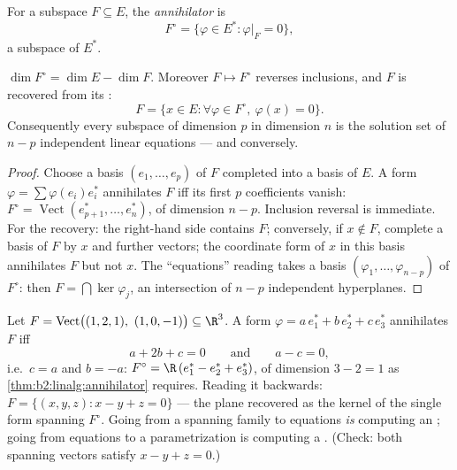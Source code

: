 \begin{definition}[Annihilator]\label{def:b2:linalg:annihilator}
For a subspace $F \subseteq E$, the
\emph{annihilator} is
\[
F^{\circ} = \{\varphi \in E^* : \varphi|_F = 0\},
\]
a subspace of $E^*$.
\end{definition}

\begin{theorem}\label{thm:b2:linalg:annihilator}
$\dim F^{\circ} = \dim E - \dim F$. Moreover $F \mapsto F^\circ$
reverses inclusions, and $F$ is recovered from its :
\[
F = \{x \in E : \forall\varphi \in F^\circ,\ \varphi(x) = 0\}.
\]
Consequently every subspace of dimension $p$ in dimension $n$ is the
solution set of $n - p$ independent linear equations --- and
conversely.
\end{theorem}

\begin{proof}
Choose a basis $(e_1, \dots, e_p)$ of $F$ completed into a basis of
$E$. A form $\varphi = \sum \varphi(e_i) e_i^*$ annihilates $F$ iff
its first $p$ coefficients vanish: $F^\circ =
\operatorname{Vect}(e_{p+1}^*, \dots, e_n^*)$, of dimension $n - p$.
Inclusion reversal is immediate. For the recovery: the right-hand
side contains $F$; conversely, if $x \notin F$, complete a basis of
$F$ by $x$ and further vectors; the coordinate form of $x$ in this
basis annihilates $F$ but not $x$. The ``equations'' reading takes a
basis $(\varphi_1, \dots, \varphi_{n-p})$ of $F^\circ$: then $F =
\bigcap \ker\varphi_j$, an intersection of $n - p$ independent
hyperplanes.
\end{proof}

\begin{example}\label{ex:b2:linalg:annihilatorwork}
Let $F = \operatorname{Vect}\bigl((1, 2, 1),\ (1, 0, -1)\bigr)
\subseteq \R^3$. A form $\varphi = a\,e_1^* + b\,e_2^* + c\,e_3^*$
annihilates $F$ iff
\[
a + 2b + c = 0
\qquad\text{and}\qquad
a - c = 0 ,
\]
i.e.\ $c = a$ and $b = -a$: $F^\circ = \R\,(e_1^* - e_2^* +
e_3^*)$, of dimension $3 - 2 = 1$ as
\cref{thm:b2:linalg:annihilator} requires. Reading it backwards:
$F = \{(x, y, z) : x - y + z = 0\}$ --- the plane recovered as
the kernel of the single form spanning $F^\circ$. Going from a
spanning family to equations \emph{is} computing an ;
going from equations to a parametrization is computing a
. (Check: both spanning vectors satisfy $x - y +
z = 0$.)
\end{example}

